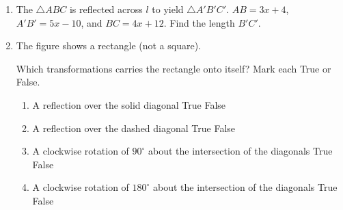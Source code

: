 \documentclass[12pt, twoside]{article}
\begin{document}
\begin{enumerate}
  \item The $\triangle ABC$ is reflected across $l$ to yield $\triangle A'B'C'$. $AB=3x+4$, $A'B'=5x-10$, and $BC=4x+12$. Find the length $B'C'$. %
      \begin{center}
    \end{center} \vspace{2cm}

\newpage
 \item The figure shows a rectangle (not a square).
   \begin{center}
   \end{center}
   Which transformations carries the rectangle onto itself? Mark each True or False.
     \begin{enumerate}
       \item A reflection over the solid diagonal \hfill True \quad False
       \item A reflection over the dashed diagonal \hfill True \quad False
       \item A clockwise rotation of $90^\circ$ about the intersection of the diagonals \hfill True \quad False
       \item A clockwise rotation of $180^\circ$ about the intersection of the diagonals \hfill True \quad False
     \end{enumerate}
     \vspace{1cm}


\end{enumerate}
\end{document}
